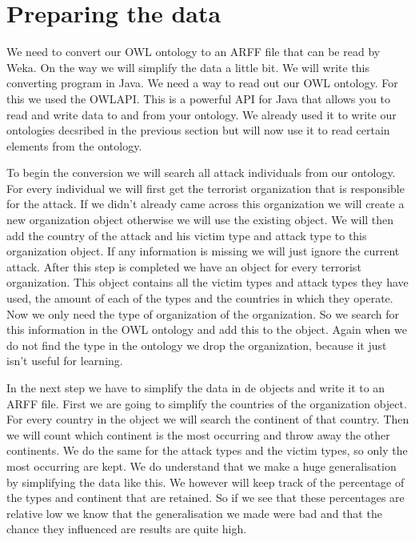 \documentclass[a4]{article}
\begin{document}
\section{Preparing the data}
\label{sec:preparing_data}
We need to convert our OWL ontology to an ARFF file that can be read by Weka. On the way we will simplify the data a little bit. We will write this converting program in Java. We need a way to read out our OWL ontology. For this we used the OWLAPI\cite{owlapi}. This is a powerful API for Java that allows you to read and write data to and from your ontology. We already used it to write our ontologies decsribed in the previous section but will now use it to read certain elements from the ontology.\par
To begin the conversion we will search all attack individuals from our ontology. For every individual we will first get the terrorist organization that is responsible for the attack. If we didn't already came across this organization we will create a new organization object otherwise we will use the existing object. We will then add the country of the attack and his victim type and attack type to this organization object. If any information is missing we will just ignore the current attack. After this step is completed we have an object for every terrorist organization. This object contains all the victim types and attack types they have used, the amount of each of the types and the countries in which they operate. Now we only need the type of organization of the organization. So we search for this information in the OWL ontology and add this to the object. Again when we do not find the type in the ontology we drop the organization, because it just isn't useful for learning.\par
In the next step we have to simplify the data in de objects and write it to an ARFF file. First we are going to simplify the countries of the organization object. For every country in the object we will search the continent of that country. Then we will count which continent is the most occurring and throw away the other continents. We do the same for the attack types and the victim types, so only the most occurring are kept. We do understand that we make a huge generalisation by simplifying the data like this. We however will keep track of the percentage of the types and continent that are retained. So if we see that these percentages are relative low we know that the generalisation we made were bad and that the chance they influenced are results are quite high.\par
\end{document}
